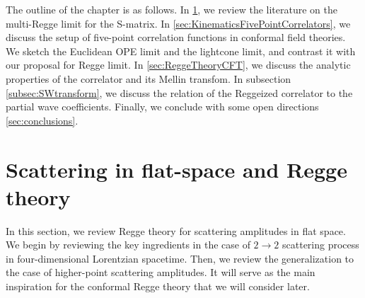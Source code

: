 The outline of the chapter is as follows.
In \cref{sec:FlatSpaceScattering}, we review the literature on the multi-Regge limit for the S-matrix.
In \cref{sec:KinematicsFivePointCorrelators}, we discuss the setup of five-point correlation functions in conformal field theories.
We sketch the Euclidean OPE limit and the lightcone limit, and contrast it with our proposal for Regge limit.
In \cref{sec:ReggeTheoryCFT}, we discuss the analytic properties of the correlator and its Mellin transfom.
In subsection \ref{subsec:SWtransform}, we discuss the relation of the Reggeized correlator to the partial wave coefficients.
Finally, we conclude with some open directions \cref{sec:conclusions}. 


\section{Scattering in flat-space and Regge theory}
\label{sec:FlatSpaceScattering}
In this section, we review Regge theory for scattering amplitudes in flat space.
We begin by reviewing the key ingredients in the case of $2 \to 2$ scattering process in four-dimensional Lorentzian spacetime.
Then, we review the generalization to the case of higher-point scattering amplitudes.
It will serve as the main inspiration for the conformal Regge theory that we will consider later.

